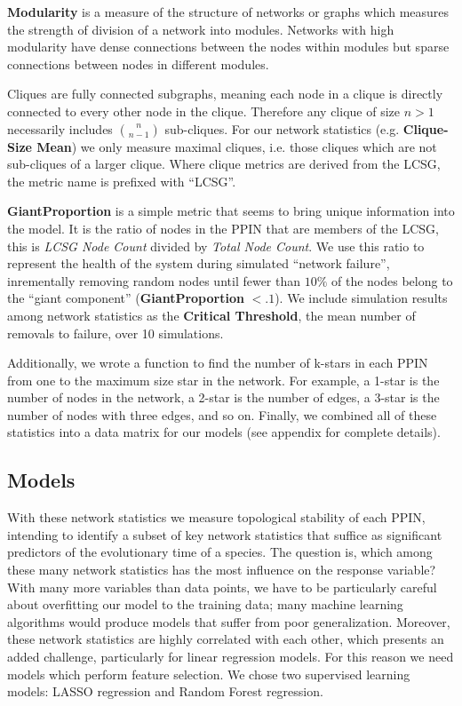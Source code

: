 \documentclass[12pt]{article}
\begin{document}
\textbf{Modularity} is a measure of the structure of networks or graphs which measures the strength of division of a network into modules. Networks with high modularity have dense connections between the nodes within modules but sparse connections between nodes in different modules.

Cliques are fully connected subgraphs, meaning each node in a clique is directly connected to every other node in the clique. Therefore any clique of size $n>1$ necessarily includes ${n \choose n-1}$ sub-cliques. For our network statistics (e.g. \textbf{Clique-Size Mean}) we only measure maximal cliques, i.e. those cliques which are not sub-cliques of a larger clique. Where clique metrics are derived from the LCSG, the metric name is prefixed with ``LCSG''.

\textbf{GiantProportion} is a simple metric that seems to bring unique information into the model. It is the ratio of nodes in the PPIN that are members of the LCSG, this is \textit{LCSG Node Count} divided by \textit{Total Node Count}. We use this ratio to represent the health of the system during simulated ``network failure'', inrementally removing random nodes until fewer than $10\%$ of the nodes belong to the ``giant component'' (\textbf{GiantProportion} $<.1$). We include simulation results among network statistics as the \textbf{Critical Threshold}, the mean number of removals to failure, over 10 simulations.

Additionally, we wrote a function to find the number of k-stars in each PPIN from one to the maximum size star in the network. For example, a 1-star is the number of nodes in the network, a 2-star is the number of edges, a 3-star is the number of nodes with three edges, and so on. Finally, we combined all of these statistics into a data matrix for our models (see appendix for complete details).

\subsection{Models}
With these network statistics we measure topological stability of each PPIN, intending to identify a subset of key network statistics that suffice as significant predictors of the evolutionary time of a species. The question is, which among these many network statistics has the most influence on the response variable? With many more variables than data points, we have to be particularly careful about overfitting our model to the training data; many machine learning algorithms would produce models that suffer from poor generalization. Moreover, these network statistics are highly correlated with each other, which presents an added challenge, particularly for linear regression models. For this reason we need models which perform feature selection. We chose two supervised learning models: LASSO regression and Random Forest regression.
\end{document}
